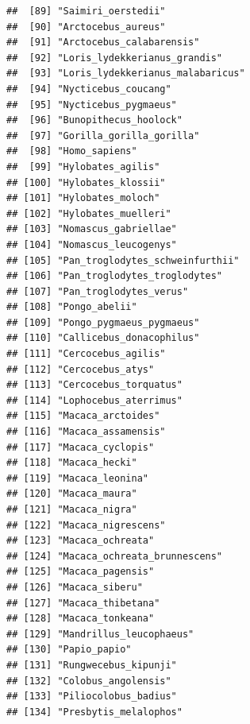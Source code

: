 \documentclass[]{article}
\begin{document}
\begin{verbatim}
##  [89] "Saimiri_oerstedii"                            
##  [90] "Arctocebus_aureus"                            
##  [91] "Arctocebus_calabarensis"                      
##  [92] "Loris_lydekkerianus_grandis"                  
##  [93] "Loris_lydekkerianus_malabaricus"              
##  [94] "Nycticebus_coucang"                           
##  [95] "Nycticebus_pygmaeus"                          
##  [96] "Bunopithecus_hoolock"                         
##  [97] "Gorilla_gorilla_gorilla"                      
##  [98] "Homo_sapiens"                                 
##  [99] "Hylobates_agilis"                             
## [100] "Hylobates_klossii"                            
## [101] "Hylobates_moloch"                             
## [102] "Hylobates_muelleri"                           
## [103] "Nomascus_gabriellae"                          
## [104] "Nomascus_leucogenys"                          
## [105] "Pan_troglodytes_schweinfurthii"               
## [106] "Pan_troglodytes_troglodytes"                  
## [107] "Pan_troglodytes_verus"                        
## [108] "Pongo_abelii"                                 
## [109] "Pongo_pygmaeus_pygmaeus"                      
## [110] "Callicebus_donacophilus"                      
## [111] "Cercocebus_agilis"                            
## [112] "Cercocebus_atys"                              
## [113] "Cercocebus_torquatus"                         
## [114] "Lophocebus_aterrimus"                         
## [115] "Macaca_arctoides"                             
## [116] "Macaca_assamensis"                            
## [117] "Macaca_cyclopis"                              
## [118] "Macaca_hecki"                                 
## [119] "Macaca_leonina"                               
## [120] "Macaca_maura"                                 
## [121] "Macaca_nigra"                                 
## [122] "Macaca_nigrescens"                            
## [123] "Macaca_ochreata"                              
## [124] "Macaca_ochreata_brunnescens"                  
## [125] "Macaca_pagensis"                              
## [126] "Macaca_siberu"                                
## [127] "Macaca_thibetana"                             
## [128] "Macaca_tonkeana"                              
## [129] "Mandrillus_leucophaeus"                       
## [130] "Papio_papio"                                  
## [131] "Rungwecebus_kipunji"                          
## [132] "Colobus_angolensis"                           
## [133] "Piliocolobus_badius"                          
## [134] "Presbytis_melalophos"                         

\end{verbatim}
\end{document}
